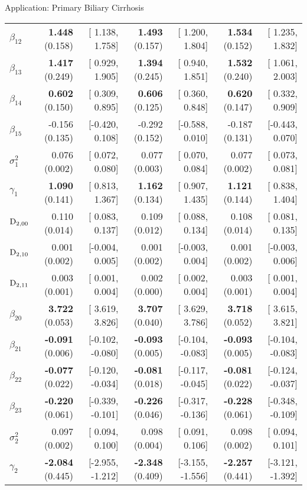 \begin{chapter}{\label{cha:app-PBC}Application: Primary Biliary Cirrhosis}
\begin{table}[ht]
\begin{tabular}{lrrrrrr}
    $\beta_{12}$ &  \textbf{1.448} (0.158) & [ 1.138, 1.758] &  \textbf{1.493} (0.157) & [ 1.200, 1.804] &  \textbf{1.534} (0.152) & [ 1.235, 1.832] \\ 
    $\beta_{13}$ &  \textbf{1.417} (0.249) & [ 0.929, 1.905] &  \textbf{1.394} (0.245) & [ 0.940, 1.851] &  \textbf{1.532} (0.240) & [ 1.061, 2.003] \\ 
    $\beta_{14}$ &  \textbf{0.602} (0.150) & [ 0.309, 0.895] &  \textbf{0.606} (0.125) & [ 0.360, 0.848] &  \textbf{0.620} (0.147) & [ 0.332, 0.909] \\ 
    $\beta_{15}$ & -0.156 (0.135) & [-0.420, 0.108] & -0.292 (0.152) & [-0.588, 0.010] & -0.187 (0.131) & [-0.443, 0.070] \\ 
    $\sigma^2_1$ &  0.076 (0.002) & [ 0.072, 0.080] &  0.077 (0.003) & [ 0.070, 0.084] &  0.077 (0.002) & [ 0.073, 0.081] \\ 
    $\gamma_1$ &  \textbf{1.090} (0.141) & [ 0.813, 1.367] & \textbf{ 1.162} (0.134) & [ 0.907, 1.435] &  \textbf{1.121 }(0.144) & [ 0.838, 1.404] \\ 
    \hdashline
    $\mathrm{D}_{2,00}$ & 0.110 (0.014) & [ 0.083, 0.137] & 0.109 (0.012) & [ 0.088, 0.134] & 0.108 (0.014) & [ 0.081, 0.135] \\ 
    $\mathrm{D}_{2,10}$ & 0.001 (0.002) & [-0.004, 0.005] & 0.001 (0.002) & [-0.003, 0.004] & 0.001 (0.002) & [-0.003, 0.006] \\ 
    $\mathrm{D}_{2,11}$ & 0.003 (0.001) & [ 0.001, 0.004] & 0.002 (0.000) & [ 0.002, 0.004] & 0.003 (0.001) & [ 0.001, 0.004] \\ 
    $\beta_{20}$ &\textbf{  3.722} (0.053) & [ 3.619,  3.826] & \textbf{ 3.707} (0.040) & [ 3.629,  3.786] & \textbf{ 3.718} (0.052) & [ 3.615,  3.821] \\ 
    $\beta_{21}$ &\textbf{ -0.091} (0.006) & [-0.102, -0.080] & \textbf{-0.093} (0.005) & [-0.104, -0.083] & \textbf{-0.093} (0.005) & [-0.104, -0.083] \\ 
    $\beta_{22}$ &\textbf{ -0.077} (0.022) & [-0.120, -0.034] & \textbf{-0.081} (0.018) & [-0.117, -0.045] & \textbf{-0.081} (0.022) & [-0.124, -0.037] \\ 
    $\beta_{23}$ &\textbf{ -0.220} (0.061) & [-0.339, -0.101] & \textbf{-0.226} (0.046) & [-0.317, -0.136] & \textbf{-0.228} (0.061) & [-0.348, -0.109] \\ 
    $\sigma^2_2$ &  0.097 (0.002) & [ 0.094,  0.100] &  0.098 (0.004) & [ 0.091,  0.106] &  0.098 (0.002) & [ 0.094,  0.101] \\ 
    $\gamma_2$ & \textbf{-2.084} (0.445) & [-2.955, -1.212] & \textbf{-2.348} (0.409) & [-3.155, -1.556] & \textbf{-2.257} (0.441) & [-3.121, -1.392] \\  

\end{tabular}
\end{table}
\end{chapter}

